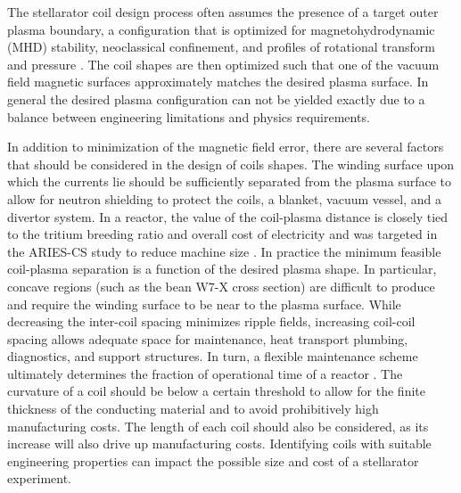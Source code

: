 \documentclass[aps,unsortedaddress]{revtex4-1}
\begin{document}
The stellarator coil design process often assumes the presence of a target outer plasma boundary, a configuration that is optimized for magnetohydrodynamic (MHD) stability, neoclassical confinement, and profiles of rotational transform and pressure \cite{Nuhrenberg1988}. The coil shapes are then optimized such that one of the vacuum field magnetic surfaces approximately matches the desired plasma surface. In general the desired plasma configuration can not be yielded exactly due to a balance between engineering limitations and physics requirements.

In addition to minimization of the magnetic field error, there are several factors that should be considered in the design of coils shapes. The winding surface upon which the currents lie should be sufficiently separated from the plasma surface to allow for neutron shielding to protect the coils, a blanket, vacuum vessel, and a divertor system. In a reactor, the value of the coil-plasma distance is closely tied to the tritium breeding ratio and overall cost of electricity and was targeted in the ARIES-CS study to reduce machine size \cite{Guebaly2008}. In practice the minimum feasible coil-plasma separation is a function of the desired plasma shape. In particular, concave regions (such as the bean W7-X cross section) are difficult to produce \cite{Landreman2016} and require the winding surface to be near to the plasma surface. While decreasing the inter-coil spacing minimizes ripple fields, increasing coil-coil spacing allows adequate space for maintenance, heat transport plumbing, diagnostics, and support structures. In turn, a flexible maintenance scheme ultimately determines the fraction of operational time of a reactor \cite{Waganer2008}. The curvature of a coil should be below a certain threshold to allow for the finite thickness of the conducting material and to avoid prohibitively high manufacturing costs. The length of each coil should also be considered, as its increase will also drive up manufacturing costs. Identifying coils with suitable engineering properties can impact the possible size and cost of a stellarator experiment. 
\end{document}
